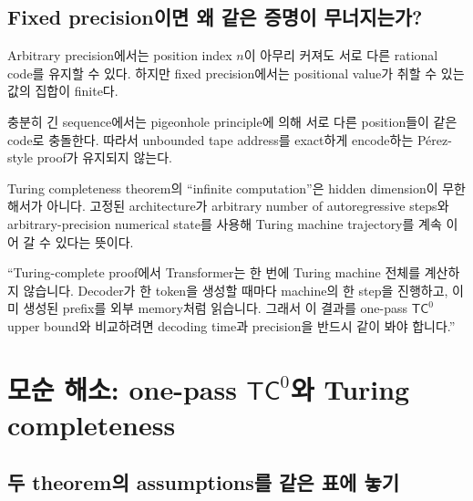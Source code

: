 \documentclass[11pt,a4paper,oneside,openany]{memoir}
\theoremstyle{definition}
\newcommand{\TC}{\mathsf{TC}}
\begin{document}
\section{Fixed precision이면 왜 같은 증명이 무너지는가?}

Arbitrary precision에서는 position index $n$이 아무리 커져도 서로 다른 rational code를 유지할 수 있다.
하지만 fixed precision에서는 positional value가 취할 수 있는 값의 집합이 finite다.

충분히 긴 sequence에서는 pigeonhole principle에 의해 서로 다른 position들이 같은 code로 충돌한다.
따라서 unbounded tape address를 exact하게 encode하는 Pérez-style proof가 유지되지 않는다.

\begin{keybox}
Turing completeness theorem의 ``infinite computation''은 hidden dimension이 무한해서가 아니다. 고정된 architecture가 arbitrary number of autoregressive steps와 arbitrary-precision numerical state를 사용해 Turing machine trajectory를 계속 이어 갈 수 있다는 뜻이다.
\end{keybox}

\begin{presentbox}
``Turing-complete proof에서 Transformer는 한 번에 Turing machine 전체를 계산하지 않습니다. Decoder가 한 token을 생성할 때마다 machine의 한 step을 진행하고, 이미 생성된 prefix를 외부 memory처럼 읽습니다. 그래서 이 결과를 one-pass $\TC^0$ upper bound와 비교하려면 decoding time과 precision을 반드시 같이 봐야 합니다.''
\end{presentbox}

\chapter{\texorpdfstring{모순 해소: one-pass $\TC^0$와 Turing completeness}{모순 해소: one-pass TC0와 Turing completeness}}

\section{두 theorem의 assumptions를 같은 표에 놓기}
\end{document}
